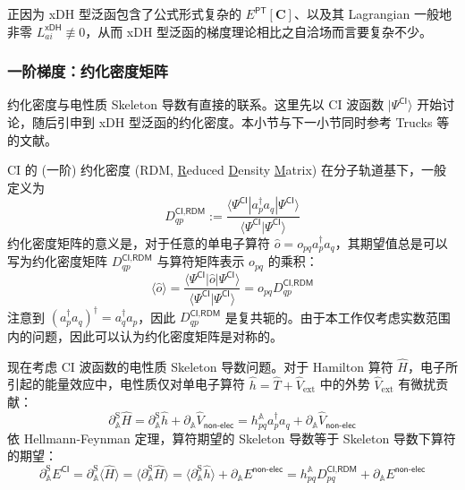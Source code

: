正因为 xDH 型泛函包含了公式形式复杂的 $E^\textsf{PT} [\mathbf{C}]$、以及其 Lagrangian 一般地非零 $L_{ai}^\textsf{xDH} \not \equiv 0$，从而 xDH 型泛函的梯度理论相比之自洽场而言要复杂不少。

\subsubsection{一阶梯度：约化密度矩阵}

约化密度与电性质 Skeleton 导数有直接的联系。这里先以 CI 波函数 $| \Psi^\textsf{CI} \rangle$ 开始讨论，随后引申到 xDH 型泛函的约化密度。本小节与下一小节同时参考 Trucks 等的文献\cite{Trucks-Bartlett.CPL.1988}。

CI 的 (一阶) 约化密度 (RDM, \underline{R}educed \underline{D}ensity \underline{M}atrix) 在分子轨道基下，一般定义为
\begin{equation}
  \label{eq.def.rdm-ci}
  D_{qp}^{\textsf{CI},\textsf{RDM}} := \frac{\langle \Psi^\textsf{CI} | a_p^\dagger a_q | \Psi^\textsf{CI} \rangle}{\langle \Psi^\textsf{CI} | \Psi^\textsf{CI} \rangle}
\end{equation}
约化密度矩阵的意义是，对于任意的单电子算符 $\hat o = o_{pq} a_p^\dagger a_q$，其期望值总是可以写为约化密度矩阵 $D_{qp}^{\textsf{CI},\textsf{RDM}}$ 与算符矩阵表示 $o_{pq}$ 的乘积：
\begin{equation*}
  \langle \hat o \rangle = \frac{\langle \Psi^\textsf{CI} | \hat o | \Psi^\textsf{CI} \rangle}{\langle \Psi^\textsf{CI} | \Psi^\textsf{CI} \rangle} = o_{pq} D_{qp}^{\textsf{CI},\textsf{RDM}}
\end{equation*}
注意到 $(a_p^\dagger a_q)^\dagger = a_q^\dagger a_p$，因此 $D_{qp}^{\textsf{CI},\textsf{RDM}}$ 是复共轭的。由于本工作仅考虑实数范围内的问题，因此可以认为约化密度矩阵是对称的。

现在考虑 CI 波函数的电性质 Skeleton 导数问题。对于 Hamilton 算符 $\hat H$，电子所引起的能量效应中，电性质仅对单电子算符 $\hat h = \hat T + \hat V_\mathrm{ext}$ 中的外势 $\hat V_\mathrm{ext}$ 有微扰贡献：
\begin{equation}
  \partial_\mathbb{A}^\mathrm{S} \hat H = \partial_\mathbb{A}^\mathrm{S} \hat h + \partial_\mathbb{A} \hat V_\textsf{non-elec} = h_{pq}^\mathbb{A} a_p^\dagger a_q + \partial_\mathbb{A} \hat V_\textsf{non-elec}
\end{equation}
依 Hellmann-Feynman 定理，算符期望的 Skeleton 导数等于 Skeleton 导数下算符的期望：
\begin{equation}
  \partial_\mathbb{A}^\mathrm{S} E^\textsf{CI} = \partial_\mathbb{A}^\mathrm{S} \langle \hat H \rangle = \langle \partial_\mathbb{A}^\mathrm{S} \hat H \rangle = \langle \partial_\mathbb{A}^\mathrm{S} \hat h \rangle + \partial_\mathbb{A} E^\textsf{non-elec} = h_{pq}^\mathbb{A} D_{pq}^{\textsf{CI}, \textsf{RDM}} + \partial_\mathbb{A} E^\textsf{non-elec}
\end{equation}

